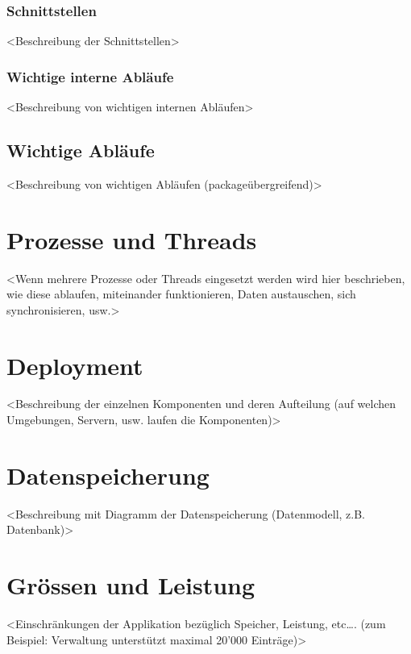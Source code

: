 \documentclass[11pt]{scrartcl}
\begin{document}
\subsubsection{Schnittstellen}
<Beschreibung der Schnittstellen>
\subsubsection{Wichtige interne Abläufe}
<Beschreibung von wichtigen internen Abläufen>
\subsection{Wichtige Abläufe}
<Beschreibung von wichtigen Abläufen (packageübergreifend)>
 
\section{Prozesse und Threads}
<Wenn mehrere Prozesse oder Threads eingesetzt werden wird hier beschrieben, wie diese ablaufen, miteinander funktionieren, Daten austauschen, sich synchronisieren, usw.>
 
\section{Deployment}
<Beschreibung der einzelnen Komponenten und deren Aufteilung (auf welchen Umgebungen, Servern, usw. laufen die Komponenten)>
 
\section{Datenspeicherung}
<Beschreibung mit Diagramm der Datenspeicherung (Datenmodell, z.B. Datenbank)>
 
\section{Grössen und Leistung}
<Einschränkungen der Applikation bezüglich Speicher, Leistung, etc…. (zum Beispiel: Verwaltung unterstützt maximal 20'000 Einträge)>
\end{document}
